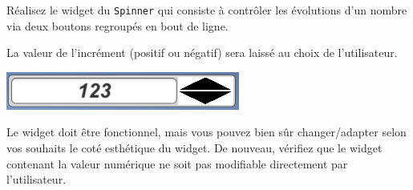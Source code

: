 \documentclass[a4paper,10pt]{article}
\begin{document}
Réalisez le widget du \texttt{Spinner} qui consiste à contrôler les évolutions d'un nombre via deux boutons regroupés en bout de ligne. 

La valeur de l'incrément (positif ou négatif) sera laissé au choix de l'utilisateur. 

\begin{center}
	\includegraphics[width=0.6\linewidth]{rc/ui_spinner_layout}
\end{center}

Le widget doit être fonctionnel, mais vous pouvez bien sûr changer/adapter selon vos souhaits le coté esthétique du widget.
De nouveau, vérifiez que le widget contenant la valeur numérique ne soit pas modifiable directement par l'utilisateur.
\end{document}
